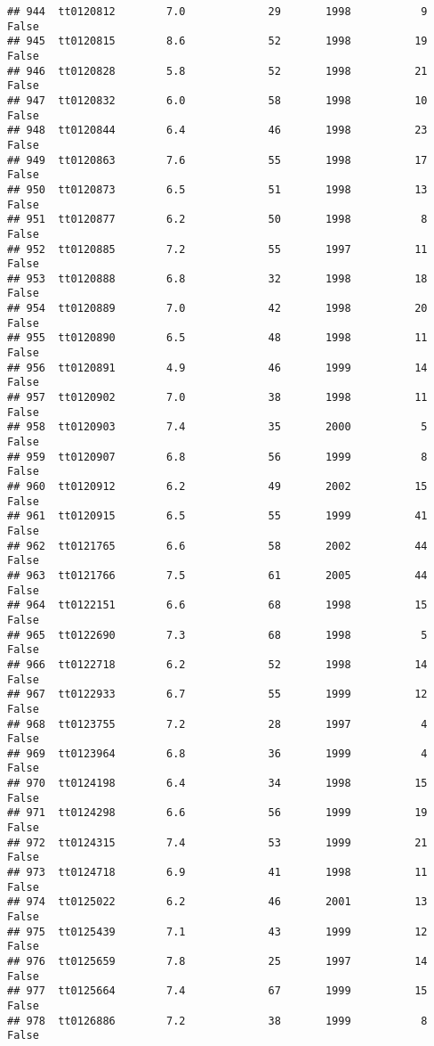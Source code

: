 \documentclass[
]{article}
\begin{document}
\begin{verbatim}
## 944  tt0120812        7.0             29       1998           9   False
## 945  tt0120815        8.6             52       1998          19   False
## 946  tt0120828        5.8             52       1998          21   False
## 947  tt0120832        6.0             58       1998          10   False
## 948  tt0120844        6.4             46       1998          23   False
## 949  tt0120863        7.6             55       1998          17   False
## 950  tt0120873        6.5             51       1998          13   False
## 951  tt0120877        6.2             50       1998           8   False
## 952  tt0120885        7.2             55       1997          11   False
## 953  tt0120888        6.8             32       1998          18   False
## 954  tt0120889        7.0             42       1998          20   False
## 955  tt0120890        6.5             48       1998          11   False
## 956  tt0120891        4.9             46       1999          14   False
## 957  tt0120902        7.0             38       1998          11   False
## 958  tt0120903        7.4             35       2000           5   False
## 959  tt0120907        6.8             56       1999           8   False
## 960  tt0120912        6.2             49       2002          15   False
## 961  tt0120915        6.5             55       1999          41   False
## 962  tt0121765        6.6             58       2002          44   False
## 963  tt0121766        7.5             61       2005          44   False
## 964  tt0122151        6.6             68       1998          15   False
## 965  tt0122690        7.3             68       1998           5   False
## 966  tt0122718        6.2             52       1998          14   False
## 967  tt0122933        6.7             55       1999          12   False
## 968  tt0123755        7.2             28       1997           4   False
## 969  tt0123964        6.8             36       1999           4   False
## 970  tt0124198        6.4             34       1998          15   False
## 971  tt0124298        6.6             56       1999          19   False
## 972  tt0124315        7.4             53       1999          21   False
## 973  tt0124718        6.9             41       1998          11   False
## 974  tt0125022        6.2             46       2001          13   False
## 975  tt0125439        7.1             43       1999          12   False
## 976  tt0125659        7.8             25       1997          14   False
## 977  tt0125664        7.4             67       1999          15   False
## 978  tt0126886        7.2             38       1999           8   False

\end{verbatim}
\end{document}
